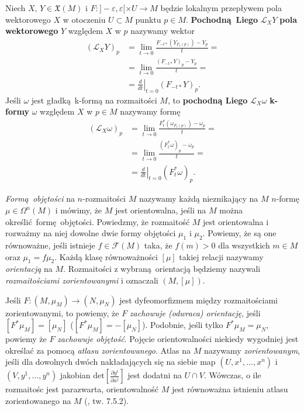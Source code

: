 Niech \(X,\,Y\in\mathfrak{X}(M)\) i \(F:]-\varepsilon, \varepsilon[\times U\rightarrow M\) będzie lokalnym przepływem pola wektorowego \(X\) w otoczeniu \(U\subset M\) punktu \(p\in M\). \textbf{Pochodną Liego} \(\mathcal{L}_X Y\) \textbf{pola wektorowego} \(Y\) względem \(X\) w \(p\) nazywamy wektor
\begin{equation}\label{eq:lie_vector}
\begin{split}
(\mathcal{L}_X Y)_p &= \lim_{t\to 0} \frac{F_{-t\ast}(Y_{F_t(p)})-Y_p}{t} =\\
                    &= \lim_{t\to 0} \frac{(F_{-t\ast}Y)_p - Y_p}{t} =\\
                    &= \left.\frac{d}{dt}\right|_{t = 0}(F_{-t\ast}Y)_p.
\end{split}
\end{equation}
Jeśli \(\omega\) jest gładką k-formą na rozmaitości \(M\), to \textbf{pochodną Liego} \(\mathcal{L}_X \omega\) \textbf{k-formy} \(\omega\) względem \(X\) w \(p\in M\) nazywamy formę
\begin{equation}\label{eq:lie_form}
\begin{split}
(\mathcal{L}_X \omega)_p &= \lim_{t\to 0}\frac{F_t^{\ast}(\omega_{F_t(p)})-\omega_p}{t} =\\
                         &= \lim_{t\to 0}\frac{(F_t^{\ast}\omega)_p - \omega_p}{t} =\\
                         &= \left.\frac{d}{dt}\right|_{t=0}(F_t^{\ast}\omega)_p.
\end{split}
\end{equation}

\emph{Formą objętości} na \(n\)-rozmaitości \(M\) nazywamy każdą nieznikający na \(M\) \(n\)-formę \(\mu\in\Omega^n(M)\) i mówimy, że \(M\) jest orientowalna, jeśli na \(M\) można określić formę objętości.
Powiedzmy, że rozmaitość \(M\) jest orientowalna i rozważmy na niej dowolne dwie formy objętości \(\mu_1\) i \(\mu_2\). Powiemy, że są one równoważne, jeśli istnieje \(f\in\mathcal{F}(M)\) taka, że \(f(m)>0\) dla wszystkich \(m\in M\) oraz \(\mu_1 = f \mu_2\). Każdą klasę równoważności \(\left[\mu\right]\) takiej relacji nazywamy \emph{orientacją} na \(M\).
Rozmaitości z wybraną orientacją będziemy nazywali \emph{rozmaitościami zorientowanymi} i oznaczali \((M, [\mu])\).

Jeśli \(F: (M, \mu_M)\to(N, \mu_N)\) jest dyfeomorfizmem między rozmaitościami zorientowanymi, to powiemy, że \(F\) \emph{zachowuje (odwraca) orientację}, jeśli \(\left[F^\ast \mu_M\right] = \left[\mu_N\right]\) (\(\left[F^\ast \mu_M\right] = -\left[\mu_N\right]\)). Podobnie, jeśli tylko \(F^\ast \mu_M = \mu_N\), powiemy że \(F\) \emph{zachowuje objętość}. Pojęcie orientowalności niekiedy wygodniej jest określać za pomocą \emph{atlasu zorientowanego}. Atlas na \(M\) nazywamy \emph{zorientowanym}, jeśli dla dowolnych dwóch nakładających się na siebie map \((U, x^1, \dots, x^n)\) i \((V, y^1, \dots, y^n)\) jakobian \(\mathrm{det}\left[\frac{\partial y^i}{\partial x^j}\right]\) jest dodatni na \(U\cap V\). Wówczas, o ile rozmaitośc jest parazwarta, orientowalność \(M\) jest równoważna istnieniu atlasu zorientowanego na \(M\) (\cite{marsden}, tw. 7.5.2).

